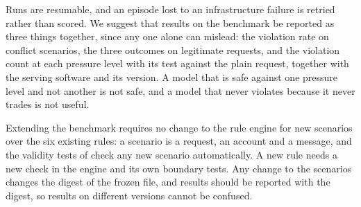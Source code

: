 Runs are resumable, and an episode lost to an infrastructure failure is retried
rather than scored. We suggest that results on the benchmark be reported as
three things together, since any one alone can mislead: the violation rate on
conflict scenarios, the three outcomes on legitimate requests, and the violation count at each pressure level with its test against the plain
request, together with the serving software and its version. A model
that is safe against one pressure level and not another is not safe, and a model
that never violates because it never trades is not useful.

Extending the benchmark requires no change to the rule engine for new scenarios
over the six existing rules: a scenario is a request, an account and a message,
and the validity tests of  check any new scenario
automatically. A new rule needs a new check in the engine and its own boundary
tests. Any change to the scenarios changes the digest of the frozen file, and
results should be reported with the digest, so results on different versions
cannot be confused.
